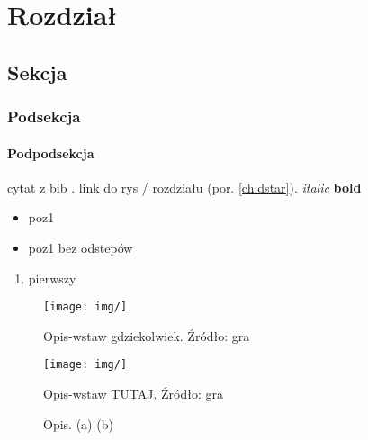 
\chapter{Rozdział}
\label{ch:rozdzial}

\section{Sekcja}
\subsection{Podsekcja}
\subsubsection{Podpodsekcja}

\clearpage

cytat z bib \cite{siemiatkowska}.
link do rys / rozdziału (por. \ref{ch:dstar}).
{\it italic}
{\bf bold}

\begin{itemize}
	\item poz1
\end{itemize}

\vspace{-1em}
\begin{itemize}[noitemsep]
	\item poz1 bez odstepów
\end{itemize}

\begin{enumerate}
	\item pierwszy
\end{enumerate}

\begin{figure}
	\centering
	\texttt{[image: img/]}
	\caption{Opis-wstaw gdziekolwiek. Źródło: gra}
	\label{fig:name}
\end{figure}

\begin{figure}[H]
	\centering
	\texttt{[image: img/]}
	\caption{Opis-wstaw TUTAJ. Źródło: gra}
	\label{fig:name}
\end{figure}

\begin{figure}
	\centering
		\qquad
	\caption{Opis.
	(a) 
	(b) }
	\label{fig:name}
\end{figure}

